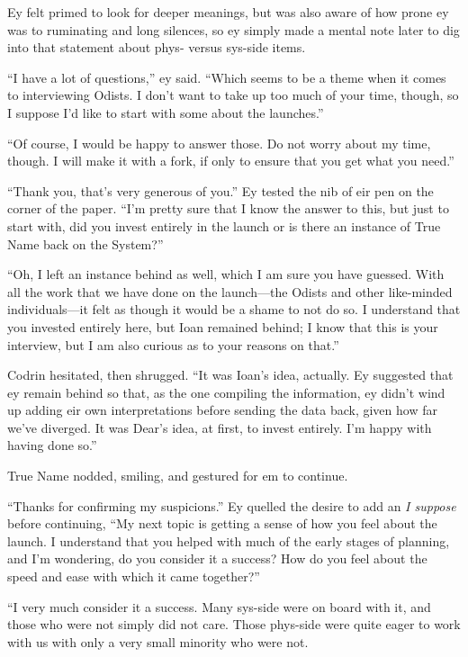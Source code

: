 Ey felt primed to look for deeper meanings, but was also aware of how prone ey was to ruminating and long silences, so ey simply made a mental note later to dig into that statement about phys- versus sys-side items.

``I have a lot of questions,'' ey said. ``Which seems to be a theme when it comes to interviewing Odists. I don't want to take up too much of your time, though, so I suppose I'd like to start with some about the launches.''

``Of course, I would be happy to answer those. Do not worry about my time, though. I will make it with a fork, if only to ensure that you get what you need.''

``Thank you, that's very generous of you.'' Ey tested the nib of eir pen on the corner of the paper. ``I'm pretty sure that I know the answer to this, but just to start with, did you invest entirely in the launch or is there an instance of True Name back on the System?''

``Oh, I left an instance behind as well, which I am sure you have guessed. With all the work that we have done on the launch---the Odists and other like-minded individuals---it felt as though it would be a shame to not do so. I understand that you invested entirely here, but Ioan remained behind; I know that this is your interview, but I am also curious as to your reasons on that.''

Codrin hesitated, then shrugged. ``It was Ioan's idea, actually. Ey suggested that ey remain behind so that, as the one compiling the information, ey didn't wind up adding eir own interpretations before sending the data back, given how far we've diverged. It was Dear's idea, at first, to invest entirely. I'm happy with having done so.''

True Name nodded, smiling, and gestured for em to continue.

``Thanks for confirming my suspicions.'' Ey quelled the desire to add an \emph{I suppose} before continuing, ``My next topic is getting a sense of how you feel about the launch. I understand that you helped with much of the early stages of planning, and I'm wondering, do you consider it a success? How do you feel about the speed and ease with which it came together?''

``I very much consider it a success. Many sys-side were on board with it, and those who were not simply did not care. Those phys-side were quite eager to work with us with only a very small minority who were not.

